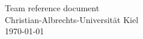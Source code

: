 \documentclass{article}
\begin{document}
\begin{titlepage}
  \centering
  \large
  \vspace*{\fill}
  \vspace{0.5\baselineskip}
  Team reference document\\
  \vspace{2.5\baselineskip}
  Christian-Albrechts-Universität Kiel \\
  \vspace{2\baselineskip}
  \today \\
  \vspace*{\fill}
\end{titlepage}
      
\begin{multicols*}{2}
  
  
  
\end{multicols*}
\end{document}
